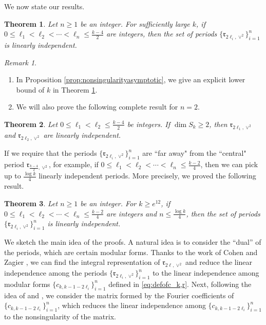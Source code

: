 \documentclass[11pt,letterpaper,reqno]{amsart}
\numberwithin{figure}{section}
\numberwithin{table}{section}
\theoremstyle{definition}
\theoremstyle{plain}
\newtheorem{theorem}{Theorem}[section]
\theoremstyle{definition}
\theoremstyle{definition}
\theoremstyle{remark}
\newtheorem{remark}{Remark}[section]
\numberwithin{equation}{section}
\theoremstyle{remark}
\begin{document}
We now state our results. 
\begin{theorem}\label{thm:asymtotic}
Let $n\geq1$ be an integer. For sufficiently large $k$, if $0\leq\ell_1<\ell_2<\cdots<\ell_n\leq\frac{k-4}{2}$  are integers, then the set of periods $\{\mathfrak{r}_{2\ell_i,\vee^2}\}_{i=1}^n$ is linearly independent. 
\end{theorem}
\begin{remark}
\begin{enumerate} 
\item In Proposition \ref{prop:nonsingularityasymptotic}, we give an explicit lower bound of $k$ in Theorem \ref{thm:asymtotic}.
\item We will also prove the following complete result for $n=2$.
\end{enumerate}
\end{remark}
\begin{theorem}\label{thm:twolinearindependent}Let $0\leq\ell_1<\ell_2\leq\frac{k-4}{2}$ be integers. If $\dim S_{k}\geq 2$, then $\mathfrak{r}_{2\ell_1,\vee^2}$ and $\mathfrak{r}_{2\ell_2,\vee^2}$ are linearly independent.   
\end{theorem}
If we require that the periods $\{\mathfrak{r}_{2\ell_i,\vee^2}\}_{i=1}^n$ are ``far away" from the ``central" period $\mathfrak{r}_{\frac{k-4}{2},\vee^2}$, for example,  if $0\leq\ell_1<\ell_2<\cdots<\ell_n\leq\frac{k-2}{4}$, then we can pick up to $\frac{\log k}{4}$ linearly independent periods. More precisely, we proved the following result.
\begin{theorem}\label{thm:firstlogk}
    Let $n\geq1$ be an integer. 
    For $k\geq e^{12}$, if $0\leq\ell_1<\ell_2<\cdots<\ell_{n}\leq\frac{k-2}{4}$ are integers and $n\leq\frac{\log k}{4}$, then the set of periods $\{\mathfrak{r}_{2\ell_i,\vee^2}\}_{i=1}^{n}$ is linearly independent.
\end{theorem}

We sketch the main idea of the proofs. A natural idea is to consider the ``dual'' of the periods, which are certain modular forms. Thanks to the work of  Cohen \cite{Cohen'smodularformC_k} and Zagier \cite{Zagier1977M}, we can find the integral representation of $\mathfrak{r}_{2\ell,\vee^2}$ and reduce the linear independence among the periods $\{\mathfrak{r}_{2\ell_i,\vee^2}\}_{i=1}^n$  to the linear independence among modular forms $\{c_{k,k-1-2\ell_i}\}_{i=1}^n$ defined in \eqref{eq:defofc_k,r}. Next, following the idea of \cite{oddperiods} and \cite{evenperiods}, we consider the matrix formed by the Fourier coefficients of $\{c_{k,k-1-2\ell_i}\}_{i=1}^n$, which reduces the linear independence among $\{c_{k,k-1-2\ell_i}\}_{i=1}^n$ to the nonsingularity of the matrix.
\end{document}
